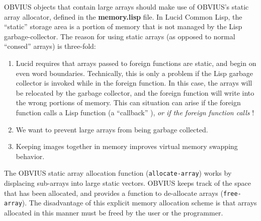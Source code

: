 OBVIUS objects that contain large arrays should make use of OBVIUS's
static array allocator, defined in the {\bf memory.lisp} file.  In
Lucid Common Lisp, the ``static'' storage area is a portion of memory
that is not managed by the Lisp garbage-collector.  The reason for
using static arrays (as opposed to normal ``consed'' arrays) is
three-fold:
\begin{enumerate}
\item 
Lucid requires that arrays passed to foreign functions are static, and
begin on even word boundaries.  
Technically, this is only a problem if
the Lisp garbage collector is invoked while in the foreign function.
In this case, the arrays will be relocated by the garbage collector,
and the foreign function will write into the wrong portions of memory.
This can situation can arise if the foreign function calls a Lisp
function (a ``callback'' ), {\em or
if the foreign function calls} ! 
\item We want to prevent large arrays from being garbage collected.
\item Keeping images together in memory improves virtual memory swapping behavior.
\end{enumerate}
The OBVIUS static array allocation function ({\tt allocate-array})
works by displacing sub-arrays into large static vectors.  OBVIUS
keeps track of the space that has been allocated, and provides a
function to de-allocate arrays ({\tt free-array}).  The disadvantage
of this explicit memory allocation scheme is that arrays allocated in
this manner must be freed by the user or the programmer.

